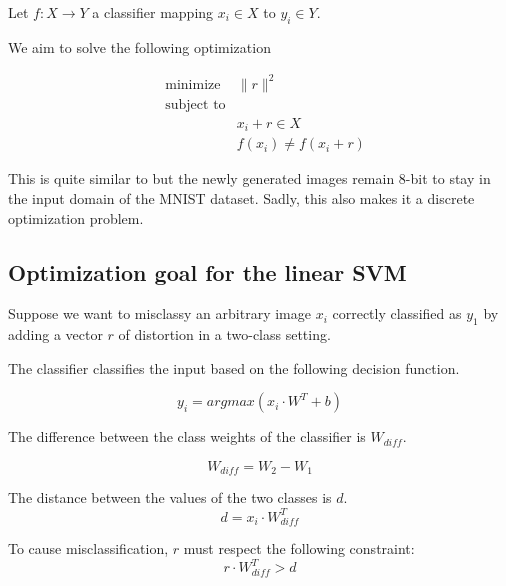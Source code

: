 \documentclass{article} %
\begin{document}
Let \begin{math} f:X \rightarrow  Y \end{math} a classifier mapping $x_i \in
X$ to $y_i \in Y$.

We aim to solve the following optimization

\begin{equation}
\label{eq:optimization}
\begin{aligned}
& {\text{minimize}}
&   \lVert{r} \rVert^2\\
& \text{subject to} \\
& & x_i + r \in X \\
& & f(x_i) \neq f(x_i + r)
\end{aligned}
\end{equation}

This is quite similar to \citep{szegedy_intriguing_2013} but the newly
generated images remain 8-bit to stay in the input domain of the MNIST dataset.
Sadly, this also makes it a discrete optimization problem.


\subsection{Optimization goal for the linear SVM}

Suppose we want to misclassy an arbitrary image $x_i$ correctly classified
as $y_1$ by adding a vector $r$ of distortion in a two-class setting.

The classifier classifies the input based on the following decision function.

\begin{equation}
\label{eq:decision_function}
  y_i = argmax (x_i \cdot W^T + b)
\end{equation}


The difference between the class weights of the classifier is $W_{diff}$.

\begin{equation}
\label{eq:difference}
  W_{diff} = W_2 - W_1
\end{equation}

The distance between the values of the two classes is $d$.
\begin{equation}
\label{eq:gap}
  d = x_i \cdot W_{diff}^T
\end{equation}


To cause misclassification, $r$ must respect the following constraint:
\begin{equation}
\label{eq:noise_threshold}
  r \cdot W_{diff}^T > d
\end{equation}
\end{document}
